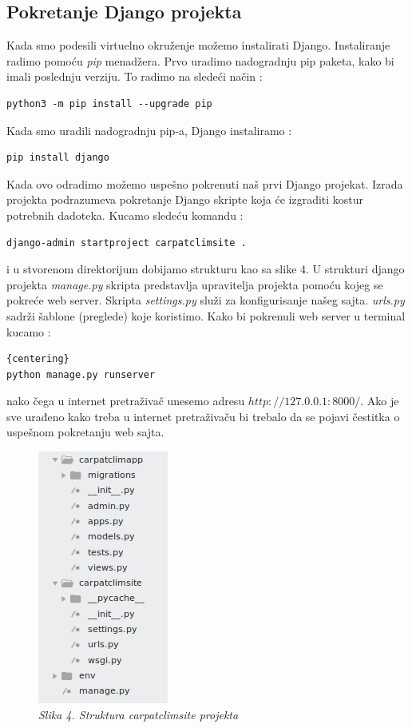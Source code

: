 \documentclass[12pt]{article}
\begin{document}
\subsection{Pokretanje Django projekta}
Kada smo podesili virtuelno okruženje možemo instalirati Django.  Instaliranje radimo pomoću \textsl{pip} menadžera. Prvo uradimo nadogradnju pip paketa, kako bi imali poslednju verziju. To radimo na sledeći način :
\begin{lstlisting}
python3 -m pip install --upgrade pip
\end{lstlisting} 
Kada smo uradili nadogradnju pip-a, Django instaliramo :
\begin{lstlisting}
pip install django
\end{lstlisting}
Kada ovo odradimo možemo uspešno pokrenuti naš prvi Django projekat. Izrada projekta podrazumeva pokretanje Django skripte koja će izgraditi kostur potrebnih dadoteka. Kucamo sledeću komandu :
\begin{lstlisting}
django-admin startproject carpatclimsite .
\end{lstlisting} 
i u stvorenom direktorijum dobijamo strukturu kao sa slike 4. U strukturi django projekta \textsl{manage.py} skripta predstavlja upravitelja projekta pomoću kojeg se pokreće web server. Skripta        \textsl{settings.py} služi za konfigurisanje našeg sajta. \textsl{urls.py} sadrži šablone (preglede) koje koristimo. Kako bi pokrenuli web server u terminal kucamo : 
\begin{lstlisting}{centering}
python manage.py runserver
\end{lstlisting}nako čega u internet pretraživač unesemo adresu $http://127.0.0.1:8000/$.  Ako je sve urađeno kako treba u internet pretraživaču bi trebalo da se pojavi čestitka o uspešnom pokretanju web sajta.
\begin{figure}[h!]
	\centering
	\includegraphics[width=0.33\linewidth]{Kosturapp.png}
	\caption*{\textsl{Slika 4. Struktura carpatclimsite projekta}}
\end{figure}
\end{document}

